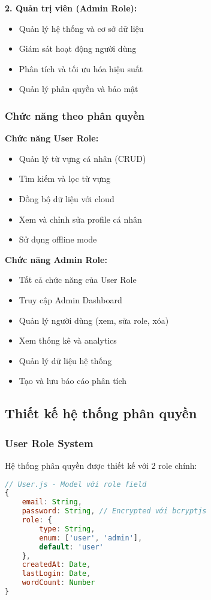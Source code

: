 \documentclass[12pt,a4paper]{article}
\begin{document}
\textbf{2. Quản trị viên (Admin Role):}
\begin{itemize}
    \item Quản lý hệ thống và cơ sở dữ liệu
    \item Giám sát hoạt động người dùng
    \item Phân tích và tối ưu hóa hiệu suất
    \item Quản lý phân quyền và bảo mật
\end{itemize}

\subsubsection{Chức năng theo phân quyền}

\textbf{Chức năng User Role:}
\begin{itemize}
    \item Quản lý từ vựng cá nhân (CRUD)
    \item Tìm kiếm và lọc từ vựng
    \item Đồng bộ dữ liệu với cloud
    \item Xem và chỉnh sửa profile cá nhân
    \item Sử dụng offline mode
\end{itemize}

\textbf{Chức năng Admin Role:}
\begin{itemize}
    \item Tất cả chức năng của User Role
    \item Truy cập Admin Dashboard
    \item Quản lý người dùng (xem, sửa role, xóa)
    \item Xem thống kê và analytics
    \item Quản lý dữ liệu hệ thống
    \item Tạo và lưu báo cáo phân tích
\end{itemize}

\subsection{Thiết kế hệ thống phân quyền}

\subsubsection{User Role System}

Hệ thống phân quyền được thiết kế với 2 role chính:

\begin{lstlisting}[language=JavaScript, caption=User Model với Role]
// User.js - Model với role field
{
    email: String,
    password: String, // Encrypted với bcryptjs
    role: {
        type: String,
        enum: ['user', 'admin'],
        default: 'user'
    },
    createdAt: Date,
    lastLogin: Date,
    wordCount: Number
}
\end{lstlisting}
\end{document}
